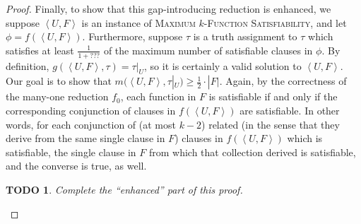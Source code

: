 \documentclass[]{article}
\theoremstyle{plain}
\newtheorem{todo}{TODO}
\theoremstyle{definition}
\newcommand{\pair}[2]{{\left\langle{#1}, {#2}\right\rangle}}
\begin{document}
\begin{proof}
  Finally, to show that this gap-introducing reduction is enhanced, we suppose $\pair{U}{F}$ is an instance of \textsc{Maximum $k$-Function Satisfiability}, and let $\phi = f(\pair{U}{F})$.
  Furthermore, suppose $\tau$ is a truth assignment to $\tau$ which satisfies at least $\frac{1}{1 + ???}$ of the maximum number of satisfiable clauses in $\phi$.
  By definition, $g(\pair{U}{F}, \tau) = \tau|_U$, so it is certainly a valid solution to $\pair{U}{F}$.
  Our goal is to show that $m(\pair{U}{F}, \tau|_U) \geq \frac{1}{2} \cdot |F|$.
  Again, by the correctness of the many-one reduction $f_0$, each function in $F$ is satisfiable if and only if the corresponding conjunction of clauses in $f(\pair{U}{F})$ are satisfiable.
  In other words, for each conjunction of (at most $k - 2$) related (in the sense that they derive from the same single clause in $F$) clauses in $f(\pair{U}{F})$ which is satisfiable, the single clause in $F$ from which that collection derived is satisfiable, and the converse is true, as well.
  \begin{todo}
    Complete the ``enhanced'' part of this proof.
  \end{todo}
\end{proof}
\end{document}
